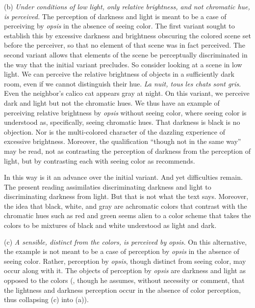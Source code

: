 (b) \emph{Under conditions of low light, only relative brightness, and not chromatic hue, is perceived.} The perception of darkness and light is meant to be a case of perceiving by \emph{opsis} in the absence of seeing color. The first variant sought to establish this by excessive darkness and brightness obscuring the colored scene set before the perceiver, so that no element of that scene was in fact perceived. The second variant allows that elements of the scene be perceptually discriminated in the way that the initial variant precludes. So consider looking at a scene in low light. We can perceive the relative brightness of objects in a sufficiently dark room, even if we cannot distinguish their hue. \emph{La nuit, tous les chats sont gris}. Even the neighbor's calico cat appears gray at night. On this variant, we perceive dark and light but not the chromatic hues. We thus have an example of perceiving relative brightness by \emph{opsis} without seeing color, where seeing color is understood as, specifically, seeing chromatic hues. That darkness is black is no objection. Nor is the multi-colored character of the dazzling experience of excessive brightness. Moreover, the qualification ``though not in the same way'' may be read, not as contrasting the perception of darkness from the perception of light, but by contrasting each with seeing color as \citet[275]{Ross:1961uq} recommends.

In this way is it an advance over the initial variant. And yet difficulties remain. The present reading assimilaties discriminating darkness and light to discriminating darkness from light. But that is not what the text says. Moreover, the idea that black, white, and gray are achromatic colors that contrast with the chromatic hues such as red and green seems alien to a color scheme that takes the colors to be mixtures of black and white understood as light and dark.

(c) \emph{A sensible, distinct from the colors, is perceived by \emph{opsis}.} On this alternative, the example is not meant to be a case of perception by \emph{opsis} in the absence of seeing color. Rather, perception by \emph{opsis}, though distinct from seeing color, may occur along with it. The objects of perception by \emph{opsis} are darkness and light as opposed to the colors (\citealt[249–50]{Johansen:2005hz}, though he assumes, without necessity or comment, that the lightness and darkness perception occur in the absence of color perception, thus collapsing (c) into (a)). 

